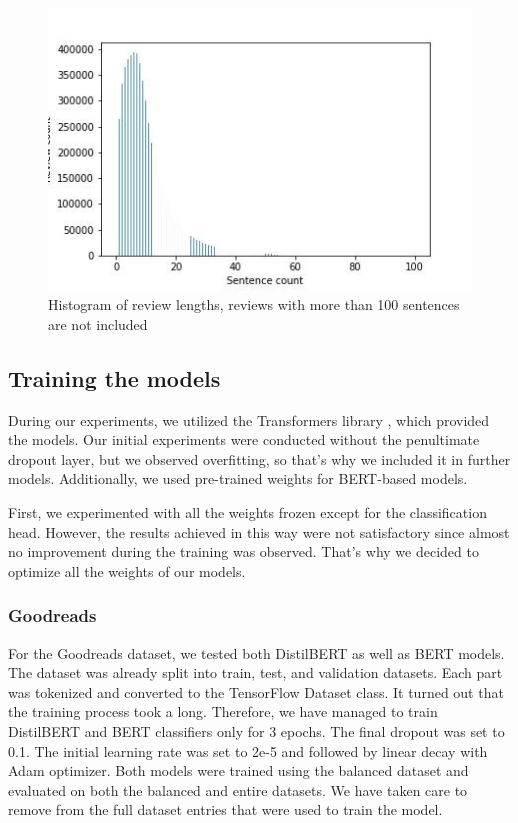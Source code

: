 \documentclass[11pt]{article}
\begin{document}
\begin{figure}[h]
    \centering
    \includegraphics[width=\columnwidth]{img/imdb-sentence-length-hist.jpg}
    \caption{Histogram of review lengths, reviews with more than 100 sentences are not included}
    \label{fig:imdb-sentence-hist}
\end{figure}


\subsection{Training the models}
During our experiments, we utilized the Transformers library \cite{wolf2020transformers}, which provided the models. Our initial experiments were conducted without the penultimate dropout layer, but we observed overfitting, so that's why we included it in further models. Additionally, we used pre-trained weights for BERT-based models.

First, we experimented with all the weights frozen except for the classification head. However, the results achieved in this way were not satisfactory since almost no improvement during the training was observed. That's why we decided to optimize all the weights of our models.

\subsubsection*{Goodreads}

For the Goodreads dataset, we tested both DistilBERT as well as BERT models. 
The dataset was already split into train, test, and validation datasets. Each part was tokenized and converted to the TensorFlow Dataset class. It turned out that the training process took a long. Therefore, we have managed to train DistilBERT and BERT classifiers only for 3 epochs. The final dropout was set to 0.1. The initial learning rate was set to 2e-5 and followed by linear decay with Adam optimizer. Both models were trained using the balanced dataset and evaluated on both the balanced and entire datasets. We have taken care to remove from the full dataset entries that were used to train the model.
\end{document}
